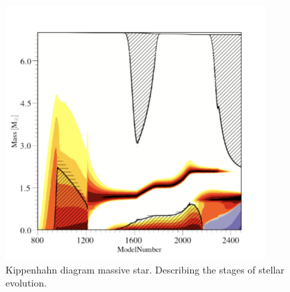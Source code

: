 \documentclass{article}
\begin{document}
\begin{figure}[H]
    \centering
    \includegraphics[width=10cm]{plots/Kipp_diagram.png}
    \caption{Kippenhahn diagram massive star. Describing the stages of stellar evolution.}
    \label{fig:KH1}
\end{figure}
\end{document}
